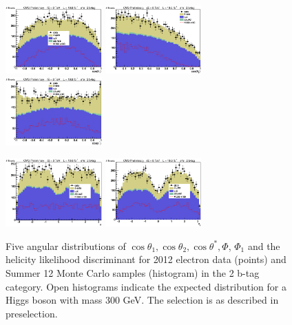 \begin{figure}[thb!]
\centerline{
\includegraphics[width=0.33\textwidth]{presentation/defense/images/preselection/2/el/costheta1.eps}
\includegraphics[width=0.33\textwidth]{presentation/defense/images/preselection/2/el/costheta2.eps}
\includegraphics[width=0.33\textwidth]{presentation/defense/images/preselection/2/el/costhetast.eps}
}
\centerline{
\includegraphics[width=0.33\textwidth]{presentation/defense/images/preselection/2/el/phi.eps}
\includegraphics[width=0.33\textwidth]{presentation/defense/images/preselection/2/el/phi1.eps}
}
\caption{
Five angular distributions of $\cos\theta_1, \cos\theta_2, \cos\theta^*, \Phi$, $\Phi_1$ and the helicity likelihood discriminant for 2012 electron data (points) and Summer 12 Monte Carlo samples (histogram) in the 2 b-tag category.  Open histograms indicate the expected distribution for a Higgs boson with mass 300 GeV. The selection is as described in preselection.
\label{helicityDistDataMCE2}}
\end{figure}
